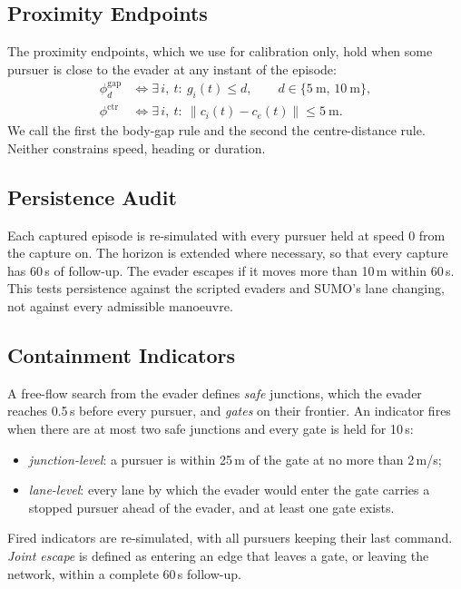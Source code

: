 \documentclass[5p,twocolumn]{elsarticle}
\begin{document}
\subsection{Proximity Endpoints}

The proximity endpoints, which we use for calibration only, hold when some pursuer is close to the evader at any
instant of the episode:
\begin{align}
\label{eq:prox}
\phi^{\mathrm{gap}}_{d} &\iff \exists\, i,\ t:\ g_i(t) \le d, \qquad d\in\{5\ \text{m},\,10\ \text{m}\}, \nonumber \\
\phi^{\mathrm{ctr}} &\iff \exists\, i,\ t:\ \lVert c_i(t)-c_e(t)\rVert \le 5\ \text{m}.
\end{align}
We call the first the body-gap rule and the second the centre-distance rule. Neither constrains speed, heading or
duration.

\subsection{Persistence Audit}

Each captured episode is re-simulated with every pursuer held at speed 0 from the capture on. The horizon is extended
where necessary, so that every capture has 60\,s of follow-up. The evader escapes if it moves more than 10\,m within
60\,s. This tests persistence against the scripted evaders and SUMO's lane changing, not against every admissible
manoeuvre.

\subsection{Containment Indicators}

A free-flow search from the evader defines \emph{safe} junctions, which the evader reaches 0.5\,s before every
pursuer, and \emph{gates} on their frontier. An indicator fires when there are at most two safe junctions and every
gate is held for 10\,s:
\begin{itemize}
\item \emph{junction-level}: a pursuer is within 25\,m of the gate at no more than 2\,m/s;
\item \emph{lane-level}: every lane by which the evader would enter the gate carries a stopped pursuer ahead of the
evader, and at least one gate exists.
\end{itemize}
Fired indicators are re-simulated, with all pursuers keeping their last command. \emph{Joint escape} is defined as
entering an edge that leaves a gate, or leaving the network, within a complete 60\,s follow-up.
\end{document}

